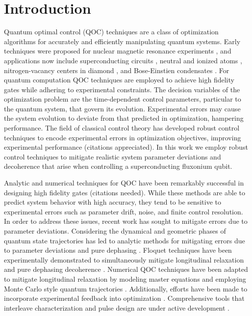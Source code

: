\section{Introduction}
Quantum optimal control (QOC) techniques are a class of optimization
algorithms for accurately and efficiently manipulating quantum systems.
Early techniques were proposed for nuclear magnetic resonance experiments
\cite{khaneja2005optimal}, and applications now include superconducting
circuits \cite{heeres2017implementing,
  huang2020engineering, leng2019robust, leung2017speedup, xu2020nonadiabatic},
neutral and ionized atoms \cite{van2016optimal}, nitrogen-vacancy centers in
diamond \cite{rembold2020introduction}, and Bose-Einstien condensates
\cite{sorensen2018quantum}. For quantum computation
QOC techniques are employed to achieve high fidelity gates
while adhering to experimental constraints.
The decision variables of the optimization problem are the time-dependent control
parameters, particular to the quantum system, that govern its evolution.
Experimental errors may cause the system evolution to deviate from that predicted in
optimization, hampering performance.
The field of classical control theory has developed robust control techniques
to encode experimental errors in optimization objectives, improving
experimental performance (citations appreciated).
In this work we employ robust control techniques to mitigate
realistic system parameter deviations and decoherence that arise when controlling
a superconducting fluxonium qubit.

Analytic and numerical techniques for QOC have been remarkably successful in
designing high fidelity gates (citations needed). 
While these methods are able to predict system behavior with high accuracy, they tend 
to be sensitive to experimental errors such as parameter drift, noise, and finite control 
resolution. 
In order to address these issues,
recent work has sought to mitigate
errors due to parameter deviations.
Considering the dynamical and geometric phases of quantum state
trajectories has led to analytic methods for mitigating
errors due to parameter deviations and pure dephasing
\cite{han2020experimental, merrill2014progress, xu2020nonadiabatic, zhang2020universal}.
Floquet techniques have been experimentally demonstrated to simultaneously mitigate
longitudinal relaxation and pure dephasing decoherence
\cite{huang2020engineering, mundada2020floquet}.
Numerical QOC techniques have been adapted to mitigate longitudinal relaxation
by modeling master equations \cite{rembold2020introduction} and employing
Monte Carlo style quantum trajectories \cite{abdelhafez2019gradient}.
Additionally, efforts have been made to incorporate experimental feedback
into optimization \cite{huang2020engineering}. Comprehensive tools that interleave characterization
and pulse design are under active development \cite{wittler2020integrated}.

